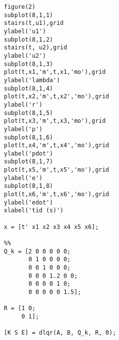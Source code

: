\begin{lstlisting}
figure(2)
subplot(8,1,1)
stairs(t,u1),grid
ylabel('u1')
subplot(8,1,2)
stairs(t, u2),grid
ylabel('u2')
subplot(8,1,3)
plot(t,x1,'m',t,x1,'mo'),grid
ylabel('lambda')
subplot(8,1,4)
plot(t,x2,'m',t,x2','mo'),grid
ylabel('r')
subplot(8,1,5)
plot(t,x3,'m',t,x3,'mo'),grid
ylabel('p')
subplot(8,1,6)
plot(t,x4,'m',t,x4','mo'),grid
ylabel('pdot')
subplot(8,1,7)
plot(t,x5,'m',t,x5','mo'),grid
ylabel('e')
subplot(8,1,8)
plot(t,x6,'m',t,x6','mo'),grid
ylabel('edot')
xlabel('tid (s)')

x = [t' x1 x2 x3 x4 x5 x6];

%%
Q_k = [2 0 0 0 0 0;
       0 1 0 0 0 0;
       0 0 1 0 0 0;
       0 0 0 1.2 0 0;
       0 0 0 0 1 0;
       0 0 0 0 0 1.5];

R = [1 0;
     0 1];

[K S E] = dlqr(A, B, Q_k, R, 0);

\end{lstlisting}